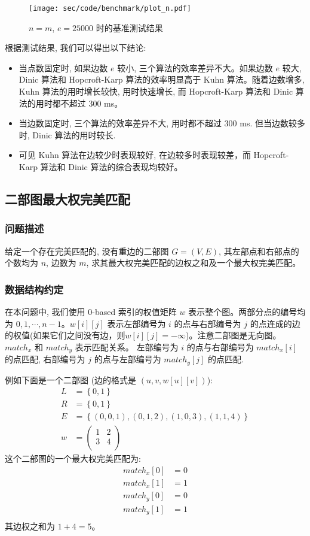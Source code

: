 \begin{figure}[H]
	\centering
	\texttt{[image: sec/code/benchmark/plot\_n.pdf]}
	\caption{$n = m$, $e = 25000$ 时的基准测试结果}
	\label{fig:benchmark_n_plot}
\end{figure}

根据测试结果, 我们可以得出以下结论: 
\begin{itemize}
	\item 当点数固定时, 如果边数 $e$ 较小, 三个算法的效率差异不大。如果边数 $e$ 较大, Dinic 算法和 Hopcroft-Karp 算法的效率明显高于 Kuhn 算法。随着边数增多, Kuhn 算法的用时增长较快, 用时快速增长, 而 Hopcroft-Karp 算法和 Dinic 算法的用时都不超过 300 ms。
	\item 当边数固定时, 三个算法的效率差异不大, 用时都不超过 300 ms. 但当边数较多时, Dinic 算法的用时较长.
	\item 可见 Kuhn 算法在边较少时表现较好, 在边较多时表现较差，而 Hopcroft-Karp 算法和 Dinic 算法的综合表现均较好。
\end{itemize}

\subsection{二部图最大权完美匹配}
\subsubsection{问题描述}
给定一个存在完美匹配的, 没有重边的二部图 $G = \left(V, E\right)$, 其左部点和右部点的个数均为 $n$, 边数为 $m$, 求其最大权完美匹配的边权之和及一个最大权完美匹配。
\subsubsection{数据结构约定}
在本问题中, 我们使用 0-based 索引的权值矩阵 $w$ 表示整个图。两部分点的编号均为 $0, 1, \cdots, n - 1$。$w[i][j]$ 表示左部编号为 $i$ 的点与右部编号为 $j$ 的点连成的边的权值(如果它们之间没有边，则$w[i][j] = -\infty$)。注意二部图是无向图。$match_x$ 和 $match_y$ 表示匹配关系。
左部编号为 $i$ 的点与右部编号为 $match_x[i]$ 的点匹配, 右部编号为 $j$ 的点与左部编号为 $match_y[j]$ 的点匹配. 

例如下面是一个二部图 (边的格式是 $(u, v, w[u][v])$):
$$
\begin{aligned}
	L &= \left\{0, 1\right\} \\
	R &= \left\{0, 1\right\} \\
	E &= \left\{(0, 0, 1), (0, 1, 2), (1, 0, 3), (1, 1, 4)\right\} \\
	w &=
	\begin{pmatrix}
		1 & 2 \\
		3 & 4 \\
	\end{pmatrix} 
\end{aligned}
$$
这个二部图的一个最大权完美匹配为:
$$
\begin{aligned}
	match_x[0] &= 0 \\
	match_x[1] &= 1 \\
	match_y[0] &= 0 \\
	match_y[1] &= 1 \\
\end{aligned}
$$
其边权之和为 $1 + 4 = 5$。

